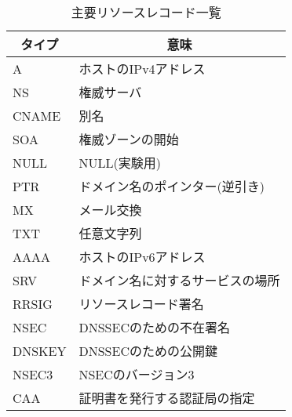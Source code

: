 \begin{table}[h]
 \caption{主要リソースレコード一覧}
 \centering
  \begin{tabular}{ll}
    \toprule
		\multicolumn{1}{c}{\textbf{タイプ}} & \multicolumn{1}{c}{\textbf{意味}} \\
    \midrule
    A &  ホストのIPv4アドレス \\
    NS & 権威サーバ \\
    CNAME & 別名 \\
    SOA & 権威ゾーンの開始 \\
    NULL & NULL(実験用) \\
    PTR & ドメイン名のポインター(逆引き) \\
    MX & メール交換 \\
    TXT & 任意文字列 \\
    AAAA & ホストのIPv6アドレス \\
		SRV & ドメイン名に対するサービスの場所\\
    RRSIG & リソースレコード署名\\
    NSEC & DNSSECのための不在署名\\
    DNSKEY & DNSSECのための公開鍵\\
    NSEC3 & NSECのバージョン3\\
    CAA & 証明書を発行する認証局の指定\\
    \bottomrule
  \end{tabular}
 \label{tab:resource-record}
\end{table}

